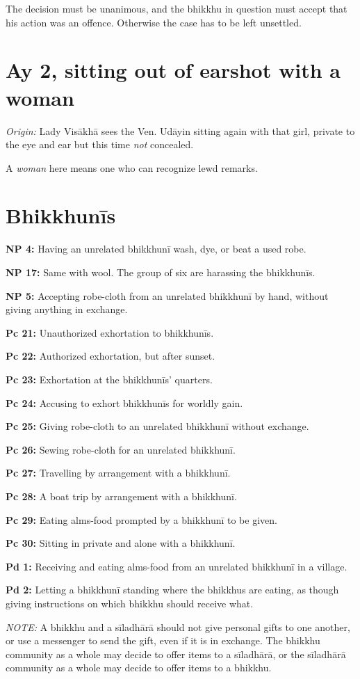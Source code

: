 The decision must be unanimous, and the bhikkhu in question must accept
that his action was an offence. Otherwise the case has to be left
unsettled.

\section{Ay 2, sitting out of earshot with a woman}

\emph{Origin:} Lady Visākhā sees the Ven. Udāyin sitting again with that
girl, private to the eye and ear but this time \emph{not} concealed.

A \emph{woman} here means one who can recognize lewd remarks.

\clearpage

\section{Bhikkhunīs}

\textbf{NP 4:} Having an unrelated bhikkhunī wash, dye, or beat a used
robe.

\textbf{NP 17:} Same with wool. The group of six are harassing the
bhikkhunīs.

\textbf{NP 5:} Accepting robe-cloth from an unrelated bhikkhunī by hand,
without giving anything in exchange.

\textbf{Pc 21:} Unauthorized exhortation to bhikkhunīs.

\textbf{Pc 22:} Authorized exhortation, but after sunset.

\textbf{Pc 23:} Exhortation at the bhikkhunīs' quarters.

\textbf{Pc 24:} Accusing to exhort bhikkhunīs for worldly gain.

\textbf{Pc 25:} Giving robe-cloth to an unrelated bhikkhunī without
exchange.

\textbf{Pc 26:} Sewing robe-cloth for an unrelated bhikkhunī.

\textbf{Pc 27:} Travelling by arrangement with a bhikkhunī.

\textbf{Pc 28:} A boat trip by arrangement with a bhikkhunī.

\textbf{Pc 29:} Eating alms-food prompted by a bhikkhunī to be given.

\textbf{Pc 30:} Sitting in private and alone with a bhikkhunī.

\textbf{Pd 1:} Receiving and eating alms-food from an unrelated
bhikkhunī in a village.

\textbf{Pd 2:} Letting a bhikkhunī standing where the bhikkhus are
eating, as though giving instructions on which bhikkhu should receive
what.

\emph{NOTE:} A bhikkhu and a sīladhārā should not give personal gifts to
one another, or use a messenger to send the gift, even if it is in
exchange. The bhikkhu community as a whole may decide to offer items to
a sīladhārā, or the sīladhārā community as a whole may decide to offer
items to a bhikkhu.

